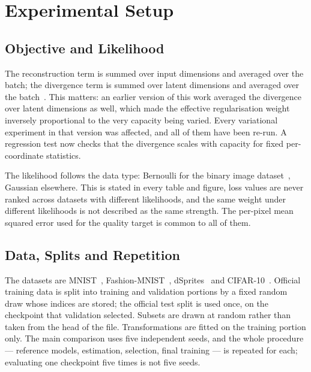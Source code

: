 \documentclass[make,article,submit,pdftex,moreauthors]{Definitions/mdpi}
\begin{document}
\section{Experimental Setup}\label{sec:setup}

\subsection{Objective and Likelihood}\label{sec:setup_loss}

The reconstruction term is summed over input dimensions and averaged over
the batch; the divergence term is summed over latent dimensions and
averaged over the batch~\cite{higgins2017betavae}. This matters: an earlier version of this work
averaged the divergence over latent dimensions as well, which made the
effective regularisation weight inversely proportional to the very
capacity being varied. Every variational experiment in that version was
affected, and all of them have been re-run. A regression test now checks
that the divergence scales with capacity for fixed per-coordinate
statistics.

The likelihood follows the data type: Bernoulli for the binary image dataset~\cite{matthey2017dsprites},
Gaussian elsewhere. This is stated in every table and figure,
loss values are never ranked across datasets with different likelihoods,
and the same weight under different likelihoods is not described as the
same strength. The per-pixel mean squared error used for the quality
target is common to all of them.

\subsection{Data, Splits and Repetition}\label{sec:setup_data}

The datasets are MNIST~\cite{lecun1998},
Fashion-MNIST~\cite{xiao2017fashion}, dSprites~\cite{matthey2017dsprites}
and CIFAR-10~\cite{krizhevsky2009learning}.
Official training data is split into training and validation portions by a
fixed random draw whose indices are stored; the official test split is
used once, on the checkpoint that validation selected. Subsets are drawn
at random rather than taken from the head of the file. Transformations are
fitted on the training portion only. The main comparison uses five
independent seeds, and the whole procedure --- reference models,
estimation, selection, final training --- is repeated for each; evaluating
one checkpoint five times is not five seeds.
\end{document}
